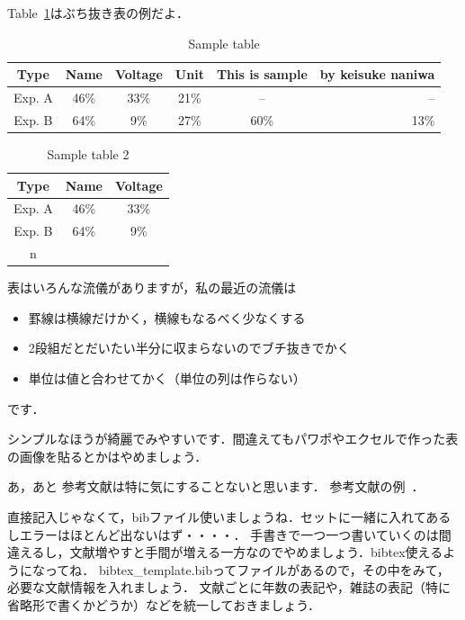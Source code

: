 \documentclass{jlreq}%
\numberwithin{equation}{section}%
\begin{document}
Table~\ref{tab:test}はぶち抜き表の例だよ．

\begin{table}[t!!]
    \caption{Sample table}
    \label{tab:test}
    \centering
    \begin{tabular}{cccccr}\hline
        Type   & Name & Voltage & Unit & This is sample & by keisuke naniwa \\ \hline \hline
        Exp. A & 46\% & 33\%    & 21\% & --             & --                \\
        Exp. B & 64\% & 9\%     & 27\% & 60\%           & 13\%              \\ \hline
    \end{tabular}
\end{table}

\begin{table}[tb]
    \caption{Sample table 2}
    \label{table:test2}
    \centering
    \begin{tabular}{ccc}\hline
        Type   & Name & Voltage \\ \hline \hline
        Exp. A & 46\% & 33\%    \\
        Exp. B & 64\% & 9\%     \\ \hline
        n\end{tabular}
\end{table}

表はいろんな流儀がありますが，私の最近の流儀は
\begin{itemize}
    \item 罫線は横線だけかく，横線もなるべく少なくする
    \item 2段組だとだいたい半分に収まらないのでブチ抜きでかく
    \item 単位は値と合わせてかく（単位の列は作らない）
\end{itemize}
です．

シンプルなほうが綺麗でみやすいです．間違えてもパワポやエクセルで作った表の画像を貼るとかはやめましょう．

あ，あと
参考文献は特に気にすることないと思います．
参考文献の例~\cite{mike,bibtest}．

直接記入じゃなくて，bibファイル使いましょうね．セットに一緒に入れてあるしエラーはほとんど出ないはず・・・・．
手書きで一つ一つ書いていくのは間違えるし，文献増やすと手間が増える一方なのでやめましょう．bibtex使えるようになってね．
bibtex\_template.bibってファイルがあるので，その中をみて，必要な文献情報を入れましょう．
文献ごとに年数の表記や，雑誌の表記（特に省略形で書くかどうか）などを統一しておきましょう．%
\end{document}
